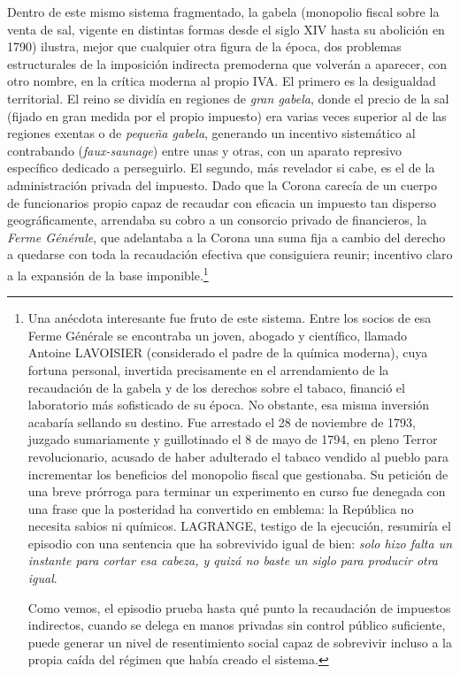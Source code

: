 \documentclass[10pt,a4paper]{article}
\begin{document}
Dentro de este mismo sistema fragmentado, la gabela (monopolio fiscal sobre la venta de sal, vigente en distintas formas desde el siglo XIV hasta su abolición en 1790) ilustra, mejor que cualquier otra figura de la época, dos problemas estructurales de la imposición indirecta premoderna que volverán a aparecer, con otro nombre, en la crítica moderna al propio IVA. El primero es la desigualdad territorial. El reino se dividía en regiones de \textit{gran gabela}, donde el precio de la sal (fijado en gran medida por el propio impuesto) era varias veces superior al de las regiones exentas o de \textit{pequeña gabela}, generando un incentivo sistemático al contrabando (\textit{faux-saunage}) entre unas y otras, con un aparato represivo específico dedicado a perseguirlo. El segundo, más revelador si cabe, es el de la administración privada del impuesto. Dado que la Corona carecía de un cuerpo de funcionarios propio capaz de recaudar con eficacia un impuesto tan disperso geográficamente, arrendaba su cobro a un consorcio privado de financieros, la \textit{Ferme Générale}, que adelantaba a la Corona una suma fija a cambio del derecho a quedarse con toda la recaudación efectiva que consiguiera reunir; incentivo claro a la expansión de la base imponible.\footnote{
Una anécdota interesante fue fruto de este sistema. Entre los socios de esa Ferme Générale se encontraba un joven, abogado y científico, llamado Antoine LAVOISIER (considerado el padre de la química moderna), cuya fortuna personal, invertida precisamente en el arrendamiento de la recaudación de la gabela y de los derechos sobre el tabaco, financió el laboratorio más sofisticado de su época. No obstante, esa misma inversión acabaría sellando su destino. Fue arrestado el 28 de noviembre de 1793, juzgado sumariamente y guillotinado el 8 de mayo de 1794, en pleno Terror revolucionario, acusado de haber adulterado el tabaco vendido al pueblo para incrementar los beneficios del monopolio fiscal que gestionaba. Su petición de una breve prórroga para terminar un experimento en curso fue denegada con una frase que la posteridad ha convertido en emblema: la República no necesita sabios ni químicos. LAGRANGE, testigo de la ejecución, resumiría el episodio con una sentencia que ha sobrevivido igual de bien: \textit{solo hizo falta un instante para cortar esa cabeza, y quizá no baste un siglo para producir otra igual}. 

Como vemos, el episodio prueba hasta qué punto la recaudación de impuestos indirectos, cuando se delega en manos privadas sin control público suficiente, puede generar un nivel de resentimiento social capaz de sobrevivir incluso a la propia caída del régimen que había creado el sistema.
}
\end{document}
